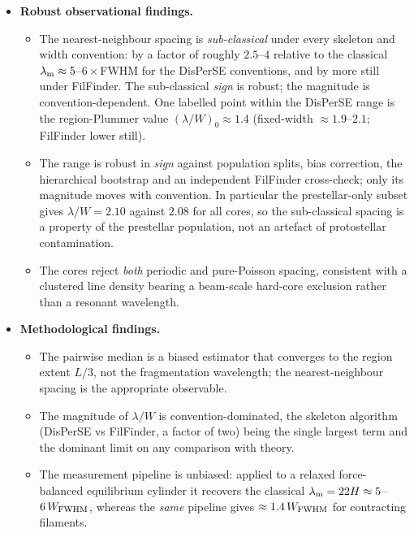 \documentclass[usenatbib,twoside,twocolumn]{mnras}
\begin{document}
\begin{itemize}
    \item \textbf{Robust observational findings.}
    \begin{itemize}
        \item The nearest-neighbour spacing is \emph{sub-classical} under every skeleton and width convention: by a factor of roughly $2.5$--$4$ relative to the classical $\lambda_{\rm m}\approx5$--$6\times$FWHM for the DisPerSE conventions, and by more still under FilFinder. The sub-classical \emph{sign} is robust; the magnitude is convention-dependent. One labelled point within the DisPerSE range is the region-Plummer value $(\lambda/W)_0\approx1.4$ (fixed-width $\approx1.9$--$2.1$; FilFinder lower still).
        \item The range is robust in \emph{sign} against population splits, bias correction, the hierarchical bootstrap and an independent FilFinder cross-check; only its magnitude moves with convention. In particular the prestellar-only subset gives $\lambda/W=2.10$ against $2.08$ for all cores, so the sub-classical spacing is a property of the prestellar population, not an artefact of protostellar contamination.
        \item The cores reject \emph{both} periodic and pure-Poisson spacing, consistent with a clustered line density bearing a beam-scale hard-core exclusion rather than a resonant wavelength.
    \end{itemize}

    \item \textbf{Methodological findings.}
    \begin{itemize}
        \item The pairwise median is a biased estimator that converges to the region extent $L/3$, not the fragmentation wavelength; the nearest-neighbour spacing is the appropriate observable.
        \item The magnitude of $\lambda/W$ is convention-dominated, the skeleton algorithm (DisPerSE vs FilFinder, a factor of two) being the single largest term and the dominant limit on any comparison with theory.
        \item The measurement pipeline is unbiased: applied to a relaxed force-balanced equilibrium cylinder it recovers the classical $\lambda_{\rm m}=22H\approx5$--$6\,W_{\rm FWHM}$, whereas the \emph{same} pipeline gives $\approx1.4\,W_{\rm FWHM}$ for contracting filaments.
    \end{itemize}


\end{itemize}
\end{document}
